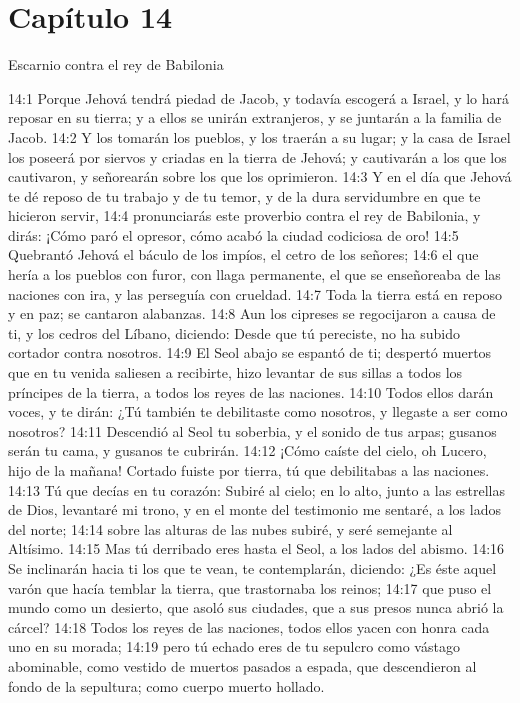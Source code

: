 \section*{Capítulo 14}
Escarnio contra el rey de Babilonia 
 
14:1 Porque Jehová tendrá piedad de Jacob, y todavía escogerá a Israel, y lo hará reposar en su tierra; y a ellos se unirán extranjeros, y se juntarán a la familia de Jacob. 
14:2 Y los tomarán los pueblos, y los traerán a su lugar; y la casa de Israel los poseerá por siervos y criadas en la tierra de Jehová; y cautivarán a los que los cautivaron, y señorearán sobre los que los oprimieron. 
14:3 Y en el día que Jehová te dé reposo de tu trabajo y de tu temor, y de la dura servidumbre en que te hicieron servir, 
14:4 pronunciarás este proverbio contra el rey de Babilonia, y dirás: ¡Cómo paró el opresor, cómo acabó la ciudad codiciosa de oro! 
14:5 Quebrantó Jehová el báculo de los impíos, el cetro de los señores; 
14:6 el que hería a los pueblos con furor, con llaga permanente, el que se enseñoreaba de las naciones con ira, y las perseguía con crueldad. 
14:7 Toda la tierra está en reposo y en paz; se cantaron alabanzas. 
14:8 Aun los cipreses se regocijaron a causa de ti, y los cedros del Líbano, diciendo: Desde que tú pereciste, no ha subido cortador contra nosotros. 
14:9 El Seol abajo se espantó de ti; despertó muertos que en tu venida saliesen a recibirte, hizo levantar de sus sillas a todos los príncipes de la tierra, a todos los reyes de las naciones. 
14:10 Todos ellos darán voces, y te dirán: ¿Tú también te debilitaste como nosotros, y llegaste a ser como nosotros? 
14:11 Descendió al Seol tu soberbia, y el sonido de tus arpas; gusanos serán tu cama, y gusanos te cubrirán. 
14:12 ¡Cómo caíste del cielo, oh Lucero, hijo de la mañana! Cortado fuiste por tierra, tú que debilitabas a las naciones. 
14:13 Tú que decías en tu corazón: Subiré al cielo; en lo alto, junto a las estrellas de Dios, levantaré mi trono, y en el monte del testimonio me sentaré, a los lados del norte; 
14:14 sobre las alturas de las nubes subiré, y seré semejante al Altísimo. 
14:15 Mas tú derribado eres hasta el Seol, a los lados del abismo. 
14:16 Se inclinarán hacia ti los que te vean, te contemplarán, diciendo: ¿Es éste aquel varón que hacía temblar la tierra, que trastornaba los reinos; 
14:17 que puso el mundo como un desierto, que asoló sus ciudades, que a sus presos nunca abrió la cárcel? 
14:18 Todos los reyes de las naciones, todos ellos yacen con honra cada uno en su morada; 
14:19 pero tú echado eres de tu sepulcro como vástago abominable, como vestido de muertos pasados a espada, que descendieron al fondo de la sepultura; como cuerpo muerto hollado. 
